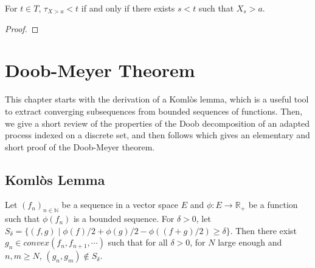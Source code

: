 \begin{lemma}\label{lem:leastGT_lt_iff}
  \leanok
For $t \in T$, $\tau_{X > a} < t$ if and only if there exists $s < t$ such that $X_s > a$.
\end{lemma}

\begin{proof}\leanok

\end{proof}


\chapter{Doob-Meyer Theorem}
\label{chap:doob_meyer}


This chapter starts with the derivation of a Komlòs lemma, which is a useful tool to extract converging subsequences from bounded sequences of functions.
Then, we give a short review of the properties of the Doob decomposition of an adapted process indexed on a discrete set, and then follows \cite{Beiglböck_Schachermayer_Veliyev_2012} which gives an elementary and short proof of the Doob-Meyer theorem.




\section{Komlòs Lemma}



\begin{lemma}\label{lem:komlos_convex}
  \leanok
Let $(f_n)_{n\in\mathbb{N}}$ be a sequence in a vector space $E$ and $\phi : E \to \mathbb{R}_+$ be a function such that $\phi(f_n)$ is a bounded sequence.
For $\delta > 0$, let $S_\delta = \{(f, g) \mid \phi(f)/2 + \phi(g)/2 - \phi((f+g)/2) \ge \delta\}$.
Then there exist $g_n\in convex(f_n,f_{n+1},\cdots)$ such that for all $\delta > 0$, for $N$ large enough and $n, m \ge N$, $(g_n, g_m) \notin S_\delta$.
\end{lemma}

